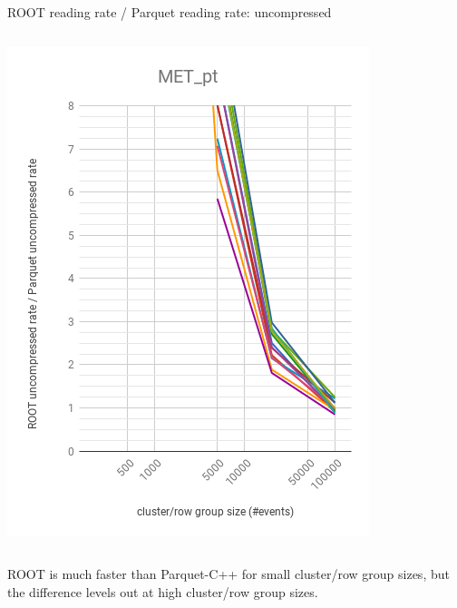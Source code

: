\documentclass[aspectratio=169]{beamer}
\begin{document}
\begin{frame}{ROOT reading rate / Parquet reading rate: uncompressed}
\begin{columns}
\begin{center}
\includegraphics[width=\linewidth]{root-none-parquet-none-MET_pt.png}
\end{center}
\end{columns}

\vspace{0.25 cm}
ROOT is much faster than Parquet-C++ for small cluster/row group sizes, but the difference levels out at high cluster/row group sizes.
\end{frame}
\end{document}
